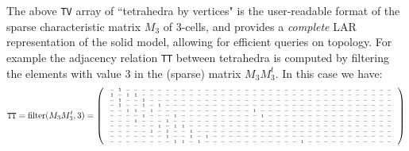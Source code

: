 \begin{example}
The above \texttt{TV} array of ``tetrahedra by vertices" is the user-readable format of the sparse characteristic matrix $M_3$ of 3-cells, and provides a \emph{complete} LAR representation of the solid model, allowing for efficient queries on topology. For example the adjacency relation \texttt{TT} between tetrahedra is computed by filtering the elements with value 3 in the (sparse) matrix $M_3M_3^t$. In this case we have:
\[
\texttt{TT} = \mathrm{filter}(M_3 M_3^t,3) = \mat{
{\tiny\arraycolsep=1.9pt%
\begin{array}
{cccccccccccccccccccccccccccccccccccc}
- & {1} & - & - & - & - & - & - & - & - & - & - & - & - & - & - & - & - & - & - & - & - & - & - & - & - & - & - & - & - & - & - & - & - & - & -\\
{1} & - & {1} & {1} & - & - & - & - & - & - & - & - & - & - & - & - & - & - & - & - & - & - & - & - & - & - & - & - & - & - & - & - & - & - & - & -\\
- & {1} & - & - & {1} & - & - & - & - & - & - & - & - & - & - & - & - & - & - & - & - & - & - & - & - & - & - & - & - & - & - & - & - & - & - & -\\
- & {1} & - & - & {1} & - & {1} & - & - & - & - & - & - & - & - & - & - & - & - & - & - & - & - & - & - & - & - & - & - & - & - & - & - & - & - & -\\
- & - & {1} & {1} & - & {1} & - & - & - & - & - & - & - & - & - & - & - & - & {1} & - & - & - & - & - & - & - & - & - & - & - & - & - & - & - & - & -\\
- & - & - & - & {1} & - & - & - & {1} & - & - & - & - & - & - & - & - & - & - & {1} & - & - & - & - & - & - & - & - & - & - & - & - & - & - & - & -\\
- & - & - & {1} & - & - & - & {1} & - & - & - & - & - & - & - & - & - & - & - & - & - & - & - & - & - & - & - & - & - & - & - & - & - & - & - & -\\
- & - & - & - & - & - & {1} & - & {1} & {1} & - & - & - & - & - & - & - & - & - & - & - & - & - & - & - & - & - & - & - & - & - & - & - & - & - & -\\
- & - & - & - & - & {1} & - & {1} & - & - & {1} & - & - & - & - & - & - & - & - & - & - & - & - & - & - & - & - & - & - & - & - & - & - & - & - & -\\
- & - & - & - & - & - & - & {1} & - & - & {1} & - & {1} & - & - & - & - & - & - & - & - & - & - & - & - & - & - & - & - & - & - & - & - & - & - & -\\
- & - & - & - & - & - & - & - & {1} & {1} & - & {1} & - & - & - & - & - & - & - & - & - & - & - & - & {1} & - & - & - & - & - & - & - & - & - & - & -\\

\end{array}}}\]
\end{example}

